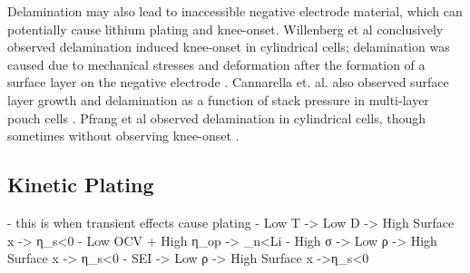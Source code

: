 \documentclass{article}
\begin{document}
Delamination may also lead to inaccessible negative electrode material, which can potentially cause lithium plating and knee-onset. Willenberg et al conclusively observed delamination induced knee-onset in cylindrical cells; delamination was caused due to mechanical stresses and deformation after the formation of a surface layer on the negative electrode \cite{willenberg_high-precision_2020}. Cannarella et. al. also observed surface layer growth and delamination as a function of stack pressure in multi-layer pouch cells \cite{cannarella_stress_2014}. Pfrang et al observed delamination in cylindrical cells, though sometimes without observing knee-onset \cite{pfrang_long-term_2018}.

\subsection{Kinetic Plating}
- this is when transient effects cause plating
    - Low T -> Low D -> High Surface x -> η_s<0
    - Low OCV + High η_op -> \eta_n<Li
    - High σ -> Low ρ -> High Surface x -> η_s<0
    - SEI -> Low ρ -> High Surface x ->η_s<0
\end{document}
